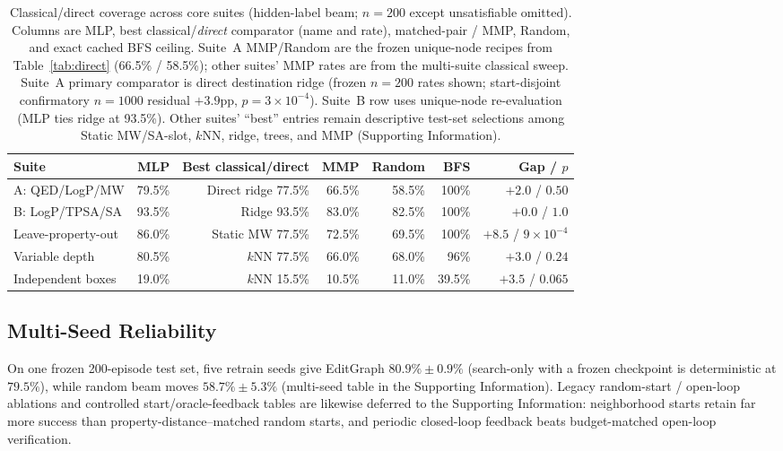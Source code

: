 \documentclass[journal=jcisd8,manuscript=article,email=false]{achemso}
\begin{document}
\begin{table}[t]
\caption{Classical/direct coverage across core suites (hidden-label beam; $n{=}200$ except unsatisfiable omitted). Columns are MLP, best classical/\emph{direct} comparator (name and rate), matched-pair / MMP, Random, and exact cached BFS ceiling. Suite~A MMP/Random are the frozen unique-node recipes from Table~\ref{tab:direct} (66.5\% / 58.5\%); other suites' MMP rates are from the multi-suite classical sweep. Suite~A primary comparator is direct destination ridge (frozen $n{=}200$ rates shown; start-disjoint confirmatory $n{=}1000$ residual $+3.9$pp, $p{=}3\times10^{-4}$). Suite~B row uses unique-node re-evaluation (MLP ties ridge at 93.5\%). Other suites' ``best'' entries remain descriptive test-set selections among Static MW/SA-slot, $k$NN, ridge, trees, and MMP (Supporting Information).}
\label{tab:classical_matrix}
\centering
\small
\begin{tabular}{lrrrrrr}
\toprule
Suite & MLP & Best classical/direct & MMP & Random & BFS & Gap / $p$ \\
\midrule
A: QED/LogP/MW & 79.5\% & Direct ridge 77.5\% & 66.5\% & 58.5\% & 100\% & $+2.0$ / $0.50$ \\
B: LogP/TPSA/SA & 93.5\% & Ridge 93.5\% & 83.0\% & 82.5\% & 100\% & $+0.0$ / $1.0$ \\
Leave-property-out & 86.0\% & Static MW 77.5\% & 72.5\% & 69.5\% & 100\% & $+8.5$ / $9\times10^{-4}$ \\
Variable depth & 80.5\% & $k$NN 77.5\% & 66.0\% & 68.0\% & 96\% & $+3.0$ / $0.24$ \\
Independent boxes & 19.0\% & $k$NN 15.5\% & 10.5\% & 11.0\% & 39.5\% & $+3.5$ / $0.065$ \\
\bottomrule
\end{tabular}
\end{table}
\FloatBarrier

\subsection{Multi-Seed Reliability}
\label{sec:multiseed}

On one frozen 200-episode test set, five retrain seeds give EditGraph $80.9\%\pm0.9\%$ (search-only with a frozen checkpoint is deterministic at $79.5\%$), while random beam moves $58.7\%\pm5.3\%$ (multi-seed table in the Supporting Information). Legacy random-start / open-loop ablations and controlled start/oracle-feedback tables are likewise deferred to the Supporting Information: neighborhood starts retain far more success than property-distance--matched random starts, and periodic closed-loop feedback beats budget-matched open-loop \mbox{verification}.
\end{document}
